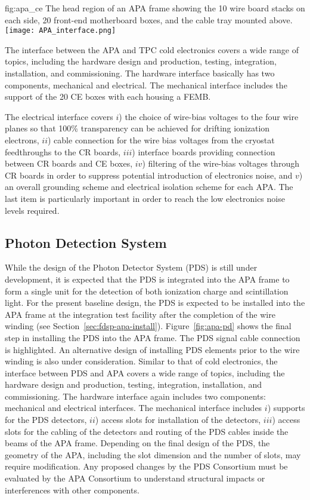 \begin{dunefigure}{fig:apa_ce}
{The head region of an APA frame showing the 10 wire board stacks on each side, 20 front-end motherboard boxes, and the cable tray mounted above.}
\texttt{[image: APA\_interface.png]}
\end{dunefigure}

The interface between the APA and TPC cold electronics covers a wide range of topics, including the hardware design and production, testing, integration, installation, and commissioning. The hardware interface basically has two components, mechanical and electrical. The mechanical interface includes the support of the 20 CE boxes with each housing a FEMB. 

The electrical interface covers $i$) the choice of wire-bias voltages to the four wire planes so that 100\% transparency can be achieved for drifting ionization electrons, $ii$) cable connection for the wire bias voltages from the cryostat feedthroughs to the CR boards, $iii$) interface boards providing connection between CR boards and CE boxes, $iv$) filtering of the wire-bias voltages through CR boards in order to suppress potential introduction of electronics noise, and $v$) an overall grounding scheme and electrical isolation scheme for each APA. The last item is particularly important in order to reach the low electronics noise levels required.


\subsection{Photon Detection System}
\label{sec:fdsp-apa-intfc-pds}

While the design of the Photon Detector System (PDS) is still under development, it is expected that the PDS is integrated into the APA frame to form a single unit for the detection of both ionization charge and scintillation light. For the present baseline design, the PDS is expected to be installed into the APA frame at the integration test facility after the completion of the wire winding (see Section~\ref{sec:fdsp-apa-install}). Figure~\ref{fig:apa-pd} shows the final step in installing the PDS into the APA frame. The PDS signal cable connection is highlighted.  An alternative design of installing PDS elements prior to the wire winding is also under consideration. Similar to that of cold electronics, the interface between PDS and APA covers a wide range of topics, including the hardware design and production, testing, integration, installation, and commissioning. The hardware interface again includes two components: mechanical and electrical interfaces. The mechanical interface includes $i$) supports for the PDS detectors, $ii$) access slots for installation of the detectors, $iii$) access slots for the cabling of the detectors and routing of the PDS cables inside the beams of the APA frame. Depending on the final design of the PDS, the geometry of the APA, including the slot dimension and the number of slots, may require modification. Any proposed changes by the PDS Consortium must be evaluated by the APA Consortium to understand structural impacts or interferences with other components.

